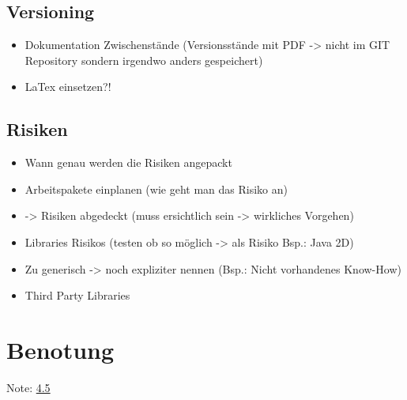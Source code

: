 \documentclass[11pt]{scrartcl}
\begin{document}
\subsection{Versioning}
\label{sec:Versioning}
\begin{itemize}
      \item Dokumentation Zwischenstände (Versionsstände mit PDF -> nicht im GIT Repository sondern 	irgendwo anders gespeichert)
      \item LaTex einsetzen?!
\end{itemize}

\subsection{Risiken}
\label{sec:Risiken}
\begin{itemize}
      \item Wann genau werden die Risiken angepackt
	\item Arbeitspakete einplanen (wie geht man das Risiko an)
	\item -> Risiken abgedeckt (muss ersichtlich sein -> wirkliches Vorgehen)
	\item Libraries Risikos (testen ob so möglich -> als Risiko Bsp.: Java 2D)
	\item Zu generisch -> noch expliziter nennen (Bsp.: Nicht vorhandenes Know-How)
	\item Third Party Libraries
\end{itemize}

\section{Benotung}
\label{sec:Benotung}
Note: \underline {4.5}
\end{document}
